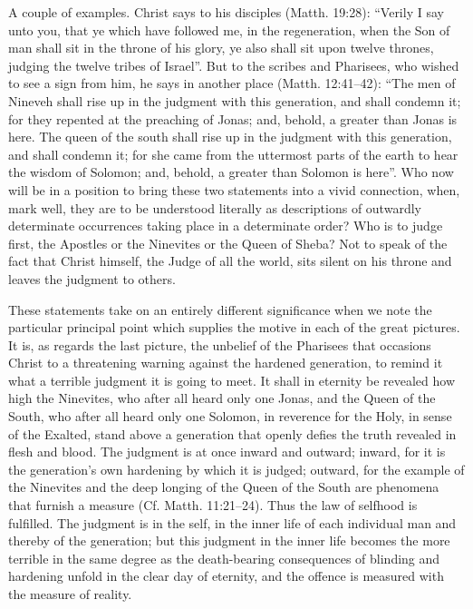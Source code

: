 \documentclass[12pt,a4paper,openany]{book}
\newcommand{\opage}[1]{\marginnote{\footnotesize\textit{[#1]}}}
\begin{document}
A couple of examples.  Christ says to his disciples
(Matth. 19:28): ``Verily I say unto you, that ye which
have followed me, in the regeneration, when the Son
of man shall sit in the throne of his glory, ye also shall
sit upon twelve thrones, judging the twelve tribes of Israel''.
But to the scribes and Pharisees, who wished to
see a sign from him, he says in another place (Matth.
12:41--42): ``The men of Nineveh shall rise up in the
judgment with this generation, and shall condemn it; for they
repented at the preaching of Jonas; and, behold, a greater
than Jonas is here.  The queen of the south shall rise up in the
judgment with this generation, and shall condemn it; for she
came from the uttermost parts of the earth to hear the wisdom of Solomon; and,
behold, a greater than Solomon is here''.  Who now will be in a
position to bring these two statements into a vivid connection,
when, mark well, they are to be understood literally
as descriptions of outwardly determinate occurrences taking place in a determinate
order?  Who is to judge first,
the Apostles or the Ninevites or the Queen of Sheba?
Not to speak of the fact that Christ himself, the Judge of all the world,
sits silent on his throne and leaves the judgment to
others.

These statements take on an entirely different significance
when we note the particular principal point which
supplies the motive in each of the great pictures.  It is,
as regards the last picture, the unbelief of the Pharisees that
occasions Christ to a threatening warning against the hardened
generation, to remind it what a terrible
judgment it is going to meet.  It shall in eternity be
\setcounter{footnote}{0}%
\opage{220}revealed how high the Ninevites, who after all heard only one
Jonas, and the Queen of the South, who after all heard only one
Solomon, in reverence for the Holy, in sense of the Exalted,
stand above a generation that openly defies the truth
revealed in flesh and blood.  The judgment is at
once inward and outward; inward, for it is the generation's
own hardening by which it is judged;
outward, for the example of the Ninevites and the deep longing
of the Queen of the South are phenomena that furnish a measure
(Cf. Matth. 11:21--24).  Thus the law of selfhood is
fulfilled.  The judgment is in the self, in the inner life of each individual
man and thereby of the generation; but this judgment
in the inner life becomes the more terrible in the same degree as
the death-bearing consequences of blinding and hardening unfold
in the clear day of eternity, and the offence is measured with
the measure of reality.
\end{document}
